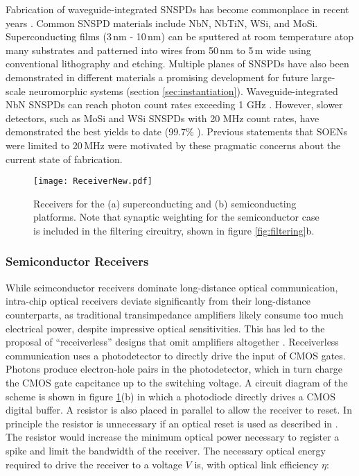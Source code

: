 \documentclass[twocolumn]{article}
\begin{document}
Fabrication of waveguide-integrated SNSPDs has become commonplace in recent years \cite{spga2011,pesc2012,feka2015,saga2015,shbu2017b,buta2020}. Common SNSPD materials include NbN, NbTiN, WSi, and MoSi. Superconducting films (3\,nm - 10\,nm) can be sputtered at room temperature atop many substrates and patterned into wires from 50\,nm to 5\,\textmu m wide using conventional lithography and etching. Multiple planes of SNSPDs have also been demonstrated in different materials \cite{vema2012} \textemdash a promising development for future large-scale neuromorphic systems (section \ref{sec:instantiation}). Waveguide-integrated NbN SNSPDs can reach photon count rates exceeding 1 GHz \cite{vetter2016cavity, rosenberg2013high}. However, slower detectors, such as MoSi and WSi SNSPDs with 20 MHz count rates, have demonstrated the best yields to date (99.7\% \cite{wove2019}). Previous statements that SOENs were limited to 20\,MHz were motivated by these pragmatic concerns about the current state of fabrication.

\begin{figure}[!h]
    \centering
    \texttt{[image: ReceiverNew.pdf]}
    \caption{Receivers for the (a) superconducting and (b) semiconducting platforms. Note that synaptic weighting for the semiconductor case is included in the filtering circuitry, shown in figure \ref{fig:filtering}b.}
    \label{fig:sup_synapse}
\end{figure}

\subsubsection{Semiconductor Receivers}
While seimconductor receivers dominate long-distance optical communication, intra-chip optical receivers deviate significantly from their long-distance counterparts, as traditional transimpedance amplifiers likely consume too much electrical power, despite impressive optical sensitivities. This has led to the proposal of ``receiverless'' designs that omit amplifiers altogether \cite{miller2017attojoule}. Receiverless communication uses a photodetector to directly drive the input of CMOS gates. Photons produce electron-hole pairs in the photodetector, which in turn charge the CMOS gate capcitance up to the switching voltage. A circuit diagram of the scheme is shown in figure \ref{fig:sup_synapse}(b) in which a photodiode directly drives a CMOS digital buffer. A resistor is also placed in parallel to allow the receiver to reset. In principle the resistor is unnecessary if an optical reset is used as described in \cite{debaes2003receiver}. The resistor would increase the minimum optical power necessary to register a spike and limit the bandwidth of the receiver. The necessary optical energy required to drive the receiver \cite{miller2017attojoule} to a voltage $V$ is, with optical link efficiency $\eta$:
\end{document}
